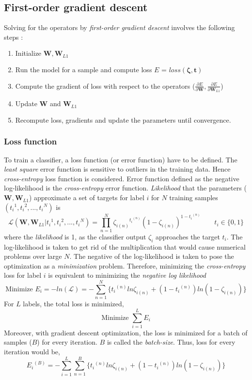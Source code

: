 \subsection{First-order gradient descent}
Solving for the operators by \textit{first-order gradient descent} involves the following steps : 
\begin{enumerate}
\setlength\itemsep{0em}
\item Initialize $\textbf{W}, \textbf{W}_{L1}$
\item Run the model for a sample and compute loss $E$ = $loss(\bm{\zeta}, \textbf{t})$
\item Compute the gradient of loss with respect to the operators ($ \frac{\partial E}{\partial \textbf{W}}, \frac{\partial E}{\partial \textbf{W}_{L1}}$)
\item Update $\textbf{W}$ and $\textbf{W}_{L1}$
\item Recompute loss, gradients and update the parameters until convergence.
\end{enumerate}

\subsubsection{Loss function}
To train a classifier, a loss function (or error function) have to be defined. The \textit{least square} error function is sensitive to outliers in the training data. Hence \textit{cross-entropy}\cite{ml} loss function is considered. Error function defined as the negative log-likelihood is the \textit{cross-entropy} error function. \textit{Likelihood} that the parameters ($\textbf{W}, \textbf{W}_{L1}$) approximate a set of targets for label $i$ for $N$ training samples $({t_{i}}^{1}, {t_{i}}^{2},...,{t_{i}}^{N})$ is
\[
\mathcal{L} (\textbf{W}, \textbf{W}_{L1} | {t_{i}}^{1}, {t_{i}}^{2},...,{t_{i}}^{N} ) =  \displaystyle\prod_{n=1}^{N} {\zeta_{i(n)}}^{{t_{i}}^{(n)}}{(1-\zeta_{i(n)})}^{1 - {t_{i}}^{(n)}} \qquad t_{i} \in \{0,1\}
\]
where the \textit{likelihood} is 1, as the classifier output $\zeta_{i}$ approaches the target $t_{i}$. The log-likelihood is taken to get rid of the multiplication that would cause numerical problems over large $N$. The negative of the log-likelihood is taken to pose the optimization as a \textit{minimization} problem. Therefore, minimizing the \textit{cross-entropy} loss for label $i$ is equivalent to minimizing the \textit{negative log likelihood}
\[
\text{Minimize } E_{i}  = -ln(\mathcal{L}) = - \displaystyle\sum_{n=1}^{N} \{ {t_{i}}^{(n)} ln \zeta_{i(n)} + (1-{t_{i}}^{(n)}) ln (1-\zeta_{i(n)}) \}
\]
For $L$ labels, the total loss is minimized,
\[
\text{Minimize } \displaystyle\sum_{i=1}^{L}E_{i} 
\]
Moreover, with gradient descent optimization, the loss is minimized for a batch of samples ($B$) for every iteration. $B$ is called the \textit{batch-size}. Thus, loss for every iteration would be,
\[
{E_{i}}^{(B)} = - \displaystyle\sum_{i=1}^{L}\displaystyle\sum_{n=1}^{B} \{ {t_{i}}^{(n)} ln \zeta_{i(n)} + (1-{t_{i}}^{(n)}) ln (1-\zeta_{i(n)}) \}
\]

